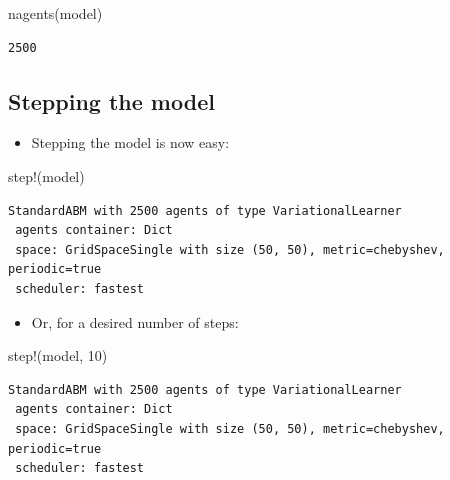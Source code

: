 \documentclass[
  letterpaper,
  DIV=11,
  numbers=noendperiod]{scrartcl}
\newenvironment{Shaded}{\begin{snugshade}}{\end{snugshade}}
\newcommand{\FloatTok}[1]{\textcolor[rgb]{0.68,0.00,0.00}{#1}}
\newcommand{\FunctionTok}[1]{\textcolor[rgb]{0.28,0.35,0.67}{#1}}
\newcommand{\NormalTok}[1]{\textcolor[rgb]{0.00,0.23,0.31}{#1}}
\providecommand{\tightlist}{%
  \setlength{\itemsep}{0pt}\setlength{\parskip}{0pt}}\usepackage{longtable,booktabs,array}
\begin{document}
\begin{Shaded}
\begin{Highlighting}[]
\FunctionTok{nagents}\NormalTok{(model)}
\end{Highlighting}
\end{Shaded}

\begin{verbatim}
2500
\end{verbatim}

\subsection{Stepping the model}\label{stepping-the-model}

\begin{itemize}
\tightlist
\item
  Stepping the model is now easy:
\end{itemize}

\begin{Shaded}
\begin{Highlighting}[]
\FunctionTok{step!}\NormalTok{(model)}
\end{Highlighting}
\end{Shaded}

\begin{verbatim}
StandardABM with 2500 agents of type VariationalLearner
 agents container: Dict
 space: GridSpaceSingle with size (50, 50), metric=chebyshev, periodic=true
 scheduler: fastest
\end{verbatim}

\begin{itemize}
\tightlist
\item
  Or, for a desired number of steps:
\end{itemize}

\begin{Shaded}
\begin{Highlighting}[]
\FunctionTok{step!}\NormalTok{(model, }\FloatTok{10}\NormalTok{)}
\end{Highlighting}
\end{Shaded}

\begin{verbatim}
StandardABM with 2500 agents of type VariationalLearner
 agents container: Dict
 space: GridSpaceSingle with size (50, 50), metric=chebyshev, periodic=true
 scheduler: fastest
\end{verbatim}
\end{document}
